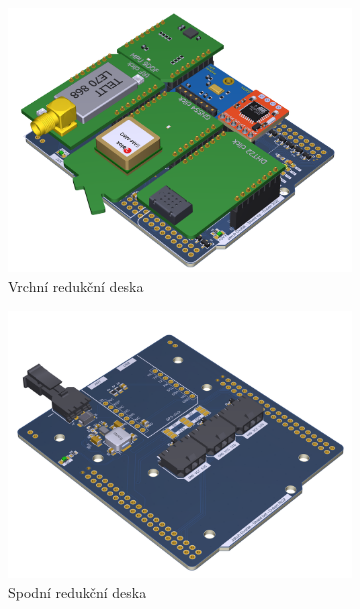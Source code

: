 \documentclass[twoside]{ctuthesis}
\theoremstyle{plain}
\theoremstyle{definition}
\theoremstyle{note}
\begin{document}
		\begin{figure}[hbtp]
			\centering
			\begin{subfigure}{0.3\textwidth}
				\centering
				\includegraphics[height=0.7\linewidth]{Figures/shield_top.png} 
				\caption{Vrchní redukční deska}
				\label{fig:shield:top}
			\end{subfigure}%
			\begin{subfigure}{.3\textwidth}
				\centering
				\includegraphics[height=0.7\linewidth]{Figures/shield_bot.png}
				\caption{Spodní redukční deska}
				\label{fig:shield:bot}
			\end{subfigure}
			\begin{subfigure}{.3\textwidth}
				\centering

\end{subfigure}
\end{figure}
\end{document}
